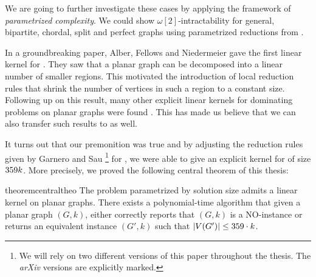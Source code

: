 We are going to further investigate these \NPc cases by applying the framework of \textit{parametrized complexity}. 
We could show $\omega[2]$-intractability for general, bipartite, chordal, split and perfect graphs using parametrized reductions from \dom.

In a groundbreaking paper, Alber, Fellows and Niedermeier \cite{Alber2004} gave the first linear kernel for \pdom. 
They saw that a planar graph can be decomposed into a linear number of smaller regions. 
This motivated the introduction of local reduction rules that shrink the number of vertices in such a region to a constant size. 
Following up on this result, many other explicit linear kernels for dominating problems on planar graphs were found \cite{Guo2007, Garnero2017, Luo2013, Alber2006}. 
This has made us believe that we can also transfer such results to \psdom as well.

It turns out that our premonition was true and by adjusting the reduction rules given by Garnero and Sau \cite{Garnero2018} \footnote{We will rely on two different versions of this paper throughout the thesis. The \textit{arXiv} versions are explicitly marked.} for \ptdom, we were able to give an explicit kernel for \psdom of size $359 k$. 
More precisely, we proved the following central theorem of this thesis:

\begin{restatable}[]{theorem}{centraltheo}\label{thm:central}
    The \sdom problem parametrized by solution size admits a linear kernel on planar graphs. There exists a polynomial-time algorithm that given a planar graph $(G, k)$, either correctly reports that $(G, k)$ is a NO-instance or returns an equivalent instance $(G', k)$ such that $\abs{V(G')} \leq 359 \cdot k$.
\end{restatable}